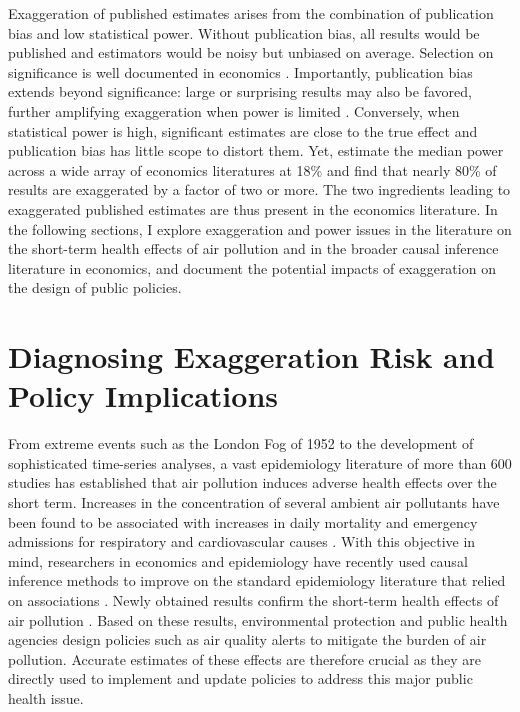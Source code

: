 \documentclass[12pt]{article}
\begin{document}
		Exaggeration of published estimates arises from the combination of publication bias and low statistical power. Without publication bias, all results would be published and estimators would be noisy but unbiased on average. Selection on significance is well documented in economics \citep{rosenthal_file_1979, brodeur_star_2016, andrews_identification_2019, vivalt_specification_2019, abadie_statistical_2020, brodeur_methods_2020, chopra_null_2024}. Importantly, publication bias extends beyond significance: large or surprising results may also be favored, further amplifying exaggeration when power is limited \citep{andrews_inference_2024}. Conversely, when statistical power is high, significant estimates are close to the true effect and publication bias has little scope to distort them. Yet, \citet{ioannidis_power_2017} estimate the median power across a wide array of economics literatures at 18\% and find that nearly 80\% of results are exaggerated by a factor of two or more. The two ingredients leading to exaggerated published estimates are thus present in the economics literature. In the following sections, I explore exaggeration and power issues in the literature on the short-term health effects of air pollution and in the broader causal inference literature in economics, and document the potential impacts of exaggeration on the design of public policies.			



\section{Diagnosing Exaggeration Risk and Policy Implications}\label{section_lit_policy}

	From extreme events such as the London Fog of 1952 to the development of sophisticated time-series analyses, a vast epidemiology literature of more than 600 studies has established that air pollution induces adverse health effects over the short term. Increases in the concentration of several ambient air pollutants have been found to be associated with increases in daily mortality and emergency admissions for respiratory and cardiovascular causes \citep{schwartz_what_1994, samet_national_2000, letertre_shortterm_2002, bell_time-series_2004, liu_ambient_2019}. With this objective in mind, researchers in economics and epidemiology have recently used causal inference methods to improve on the standard epidemiology literature that relied on associations \citep{dominici_best_2017, bind_causal_2019}. Newly obtained results confirm the short-term health effects of air pollution \citep{schwartz_estimating_2015, schwartz_national_2018, deryugina_mortality_2019}. Based on these results, environmental protection and public health agencies design policies such as air quality alerts to mitigate the burden of air pollution. Accurate estimates of these effects are therefore crucial as they are directly used to implement and update policies to address this major public health issue.
	
\end{document}
